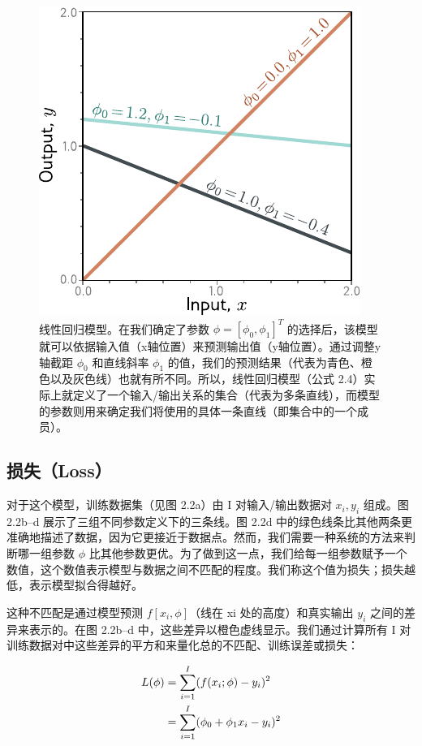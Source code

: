 \documentclass[lang=cn,newtx,10pt,scheme=chinese]{elegantbook}
\begin{document}
\begin{figure}
	\centering
	\includegraphics[width=0.7\linewidth]{PDFFigures/UDLChap2PDF/SupervisedLinear.pdf}
	\caption{线性回归模型。在我们确定了参数 $\phi = [\phi_0 , \phi_1 ]^T$ 的选择后，该模型就可以依据输入值（x轴位置）来预测输出值（y轴位置）。通过调整y轴截距 $\phi_0$ 和直线斜率 $\phi_1$ 的值，我们的预测结果（代表为青色、橙色以及灰色线）也就有所不同。所以，线性回归模型（公式 2.4）实际上就定义了一个输入/输出关系的集合（代表为多条直线），而模型的参数则用来确定我们将使用的具体一条直线（即集合中的一个成员）。}
\end{figure}


\subsection{损失（Loss）}

对于这个模型，训练数据集（见图 2.2a）由 I 对输入/输出数据对 ${x_i, y_i}$ 组成。图 2.2b–d 展示了三组不同参数定义下的三条线。图 2.2d 中的绿色线条比其他两条更准确地描述了数据，因为它更接近于数据点。然而，我们需要一种系统的方法来判断哪一组参数 $\phi$ 比其他参数更优。为了做到这一点，我们给每一组参数赋予一个数值，这个数值表示模型与数据之间不匹配的程度。我们称这个值为损失；损失越低，表示模型拟合得越好。

这种不匹配是通过模型预测 $f[x_i,\phi]$（线在 xi 处的高度）和真实输出 $y_i$ 之间的差异来表示的。在图 2.2b–d 中，这些差异以橙色虚线显示。我们通过计算所有 I 对训练数据对中这些差异的平方和来量化总的不匹配、训练误差或损失：

\begin{align}
	L(\phi) &= \sum_{i=1}^{I} (f(x_i; \phi) - y_i)^2  \notag \\
	&= \sum_{i=1}^{I} (\phi_0 + \phi_1 x_i - y_i)^2 
\end{align}
\end{document}
